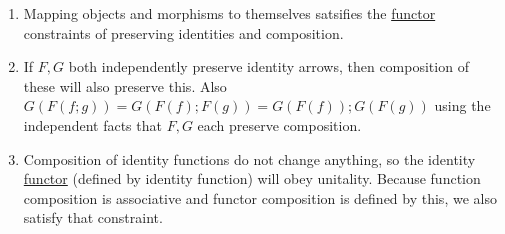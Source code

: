 \begin{enumerate}
    \item  Mapping objects and morphisms to themselves satsifies the \hyperref[D3.35]{functor} constraints of preserving identities and composition.
    \item If $F,G$ both independently preserve identity arrows, then composition of these will also preserve this. Also $G(F(f;g))=G(F(f);F(g))=G(F(f));G(F(g))$ using the independent facts that $F,G$ each preserve composition.
    \item Composition of identity functions do not change anything, so the identity \hyperref[D3.35]{functor} (defined by identity function) will obey unitality. Because function composition is associative and functor composition is defined by this, we also satisfy that constraint.

  \end{enumerate}
